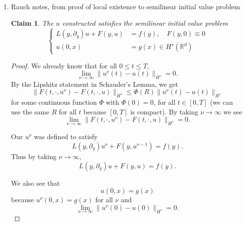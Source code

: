 \documentclass[a4paper]{article}
\newtheorem*{claim}{Claim}
\newcommand{\R}{\mathbb{R}}
\begin{document}
\begin{enumerate}
  \item Rauch notes, from proof of local existence to semilinear initial value problem
    \begin{claim} The $u$ constructed satisfies the semilinear initial value problem
      \[ \begin{cases}
	L(y,\partial_y) u + F(y,u) &= f(y), \quad F(y,0) \equiv 0 \\
	u(0,x) &= g(x) \in H^s(\R^d)
    \end{cases} \]
    \end{claim}

    \begin{proof}
      We already know that for all $0 \leq t \leq T$, 
      \[ \lim_{\nu \to \infty} \| u^\nu(t) - u(t) \|_{H^s} = 0 .\]
      By the Lipshitz statement in Schauder's Lemma, we get
      \[ \| F(t,\cdot, u^\nu) - F(t,\cdot,u) \|_{H^s} \leq \Phi(R) \|u^\nu(t) - u(t) \|_{H^s} \]
      for some continuous function $\Phi$ with $\Phi(0)=0$, for all $t \in [0,T]$ (we can use the same $R$ for all $t$ because $[0,T]$ is compact). By taking $\nu \to \infty$ we see
      \[ \lim_{\nu \to \infty} \| F(t,\cdot, u^\nu) - F(t,\cdot,u) \|_{H^s} = 0.\]

      Our $u^\nu$ was defined to satisfy
      \[ L(y,\partial_y) u^\nu + F(y,u^{\nu-1}) = f(y) .\]
      Thus by taking $\nu \to \infty$,
      \[ L(y,\partial_y) u + F(y,u) = f(y) .\]

      We also see that
      \[ u(0,x) = g(x) \]
      because $u^\nu(0,x) = g(x)$ for all $\nu$ and 
      \[ \lim_{\nu \to \infty} \|u^\nu(0) - u(0)\|_{H^s} = 0.\]
    \end{proof}
\end{enumerate}
\end{document}
